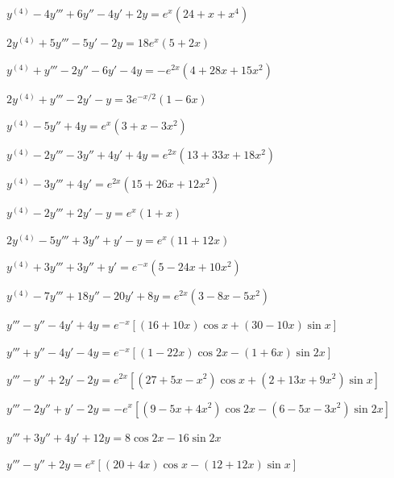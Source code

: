 \begin{exerciselist}
  \item\label{exer:9.3.18} $y^{(4)}-4y'''+6y''-4y'+2y=e^{x}(24+x+x^{4})$

  \item\label{exer:9.3.19} $2y^{(4)}+5y'''-5y'-2y=18e^{x}(5+2x)$

  \item\label{exer:9.3.20} $y^{(4)}+y'''-2y''-6y'-4y=-e^{2x}(4+28x+15x^{2})$

  \item\label{exer:9.3.21} $2y^{(4)}+y'''-2y'-y=3e^{-x/2}(1-6x)$

  \item\label{exer:9.3.22} $y^{(4)}-5y''+4y=e^{x}(3+x-3x^{2})$

  \item\label{exer:9.3.23} $y^{(4)}-2y'''-3y''+4y'+4y=e^{2x}(13+33x+18x^{2})$

  \item\label{exer:9.3.24} $y^{(4)}-3y'''+4y'=e^{2x}(15+26x+12x^{2})$

  \item\label{exer:9.3.25} $y^{(4)}-2y'''+2y'-y=e^{x}(1+x)$

  \item\label{exer:9.3.26} $2y^{(4)}-5y'''+3y''+y'-y=e^{x}(11+12x)$

  \item\label{exer:9.3.27} $y^{(4)}+3y'''+3y''+y'=e^{-x}(5-24x+10x^{2})$

  \item\label{exer:9.3.28} $y^{(4)}-7y'''+18y''-20y'+8y=e^{2x}(3-8x-5x^{2})$

  \item\label{exer:9.3.29} $y'''-y''-4y'+4y=e^{-x}\left[(16+10x)\cos x+(30-10x)\sin x\right]$

  \item\label{exer:9.3.30} $y'''+y''-4y'-4y=e^{-x}\left[(1-22x)\cos 2x-(1+6x)\sin2x\right]$

  \item\label{exer:9.3.31} $y'''-y''+2y'-2y=e^{2x}[(27+5x-x^{2})\cos x+(2+13x+9x^{2})\sin x]$

  \item\label{exer:9.3.32} $y'''-2y''+y'-2y=-e^{x}[(9-5x+4x^{2})\cos 2x-(6-5x-3x^{2})\sin2x]$

  \item\label{exer:9.3.33} $y'''+3y''+4y'+12y=8\cos2x-16\sin2x$

  \item\label{exer:9.3.34} $y'''-y''+2y=e^{x}[(20+4x)\cos x-(12+12x)\sin x]$


\end{exerciselist}
